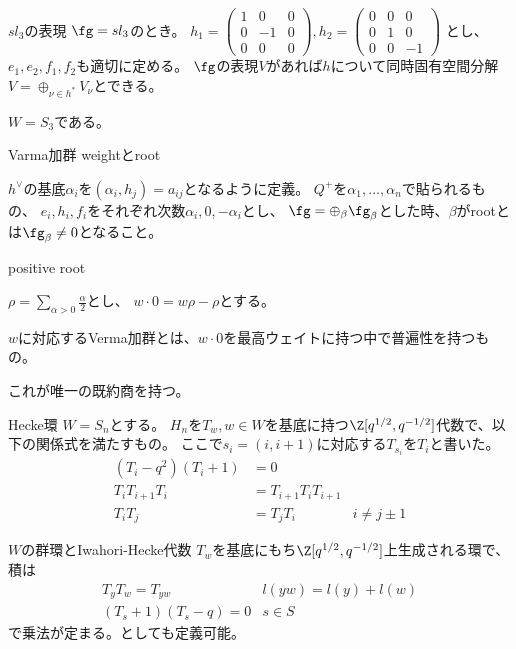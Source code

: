 \documentclass[dvipdfmx]{beamer}
\begin{document}
\begin{frame}{$sl_3$の表現}
  $\fg=sl_3$のとき。
  $h_1=\begin{pmatrix}1&0&0\\0&-1&0\\0&0&0\end{pmatrix},
  h_2=\begin{pmatrix}0&0&0\\0&1&0\\0&0&-1\end{pmatrix}$
  とし、$e_1, e_2, f_1,f_2$も適切に定める。
  $\fg$の表現$V$があれば$h$について同時固有空間分解$V=\oplus_{\nu\in h^*}V_\nu$とできる。

  $W=S_3$である。
\end{frame}

\begin{frame}{Varma加群}
weightとroot

$h^\vee$の基底$\alpha_i$を$(\alpha_i,h_j)=a_{ij}$となるように定義。
$Q^+$を$\alpha_1,\ldots,\alpha_n$で貼られるもの、
$e_i,h_i,f_i$をそれぞれ次数$\alpha_i,0,-\alpha_i$とし、
$\fg=\oplus_\beta\fg_\beta$とした時、$\beta$がrootとは$\fg_\beta\neq0$となること。

positive root

$\rho=\sum_{\alpha>0}\frac{\alpha}{2}$とし、
$w\cdot0=w\rho-\rho$とする。

$w$に対応するVerma加群とは、$w\cdot0$を最高ウェイトに持つ中で普遍性を持つもの。

これが唯一の既約商を持つ。
\end{frame}

\begin{frame}{Hecke環}
  $W=S_n$とする。
  $H_n$を$T_w, w\in W$を基底に持つ$\Z[q^{1/2},q^{-1/2}]$代数で、以下の関係式を満たすもの。
  ここで$s_i=(i, i+1)$に対応する$T_{s_i}$を$T_i$と書いた。
  \begin{align*}
    (T_i-q^2)(T_i+1)&=0\\
    T_iT_{i+1}T_i&=T_{i+1}T_iT_{i+1}\\
    T_iT_j&=T_jT_i&i\neq j\pm1
  \end{align*}

  $W$の群環とIwahori-Hecke代数
  $T_w$を基底にもち$\Z[q^{1/2}, q^{-1/2}]$上生成される環で、積は
  \begin{align*}
    T_yT_w=T_{yw}& l(yw)=l(y)+l(w)\\
    (T_s+1)(T_s-q)=0 & s\in S
  \end{align*}
  で乗法が定まる。としても定義可能。
\end{frame}
\end{document}
